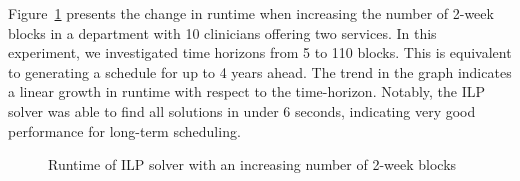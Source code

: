 Figure~\ref{fig:runtime-blocks} presents the change in runtime when increasing
the number of 2-week blocks in a department with 10
clinicians offering two services. In this experiment, we investigated time horizons
from 5 to 110 blocks. This is equivalent to generating a schedule for up to 4 years ahead.
The trend in the graph indicates a linear growth in runtime with respect to the time-horizon.
Notably, the ILP solver was able to find all solutions in under 6 seconds, indicating very 
good performance for long-term scheduling. 

\begin{figure}[h]
	\centering
	\def\svgwidth{\textwidth}
	\caption{Runtime of ILP solver with an increasing number of 2-week blocks}%
	
  \label{fig:runtime-blocks}
\end{figure}


